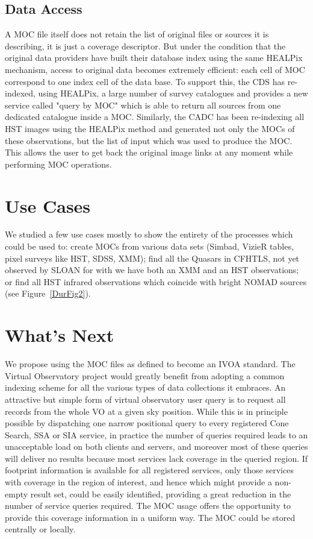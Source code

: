 \subsection{Data Access}
A MOC file itself does not retain the list of original files or sources it is describing, it is just a coverage descriptor. But under the condition that the original data providers have built their database index using the same HEALPix mechanism, access to original data becomes extremely efficient: each cell of MOC correspond to one index cell of the data base. To support this, the CDS has re-indexed, using HEALPix, a large number of survey catalogues and provides a new service called "query by MOC" which is able to return all sources from one dedicated catalogue inside a MOC. Similarly, the CADC has been re-indexing all HST images using the HEALPix method and generated not only the MOCs of these observations, but the list of input which was used to produce the MOC. This allows the user to get back the original image links at any moment while performing MOC operations.

\section{Use Cases}
We studied a few use cases mostly to show the entirety of the processes which could be used to: create MOCs from various data sets (Simbad, VizieR tables, pixel surveys like HST, SDSS, XMM); find all the Quasars in CFHTLS, not yet observed by SLOAN for with we have both an XMM and an HST observations; or find all HST infrared observations which coincide with bright NOMAD sources (see Figure~\ref{DurFig2}).


\section{What's Next}

We propose using the MOC files as defined to become an IVOA standard. The Virtual Observatory project would greatly benefit from adopting a common indexing scheme for all the various types of data collections it embraces. An attractive but simple form of virtual observatory user query is to request all records from the whole VO at a given sky position. While this is in principle possible by dispatching one narrow positional query to every registered Cone Search, SSA or SIA service, in practice the number of queries required leads to an unacceptable load on both clients and servers, and moreover most of these queries will deliver no results because most services lack coverage in the queried region. If footprint information is available for all registered services, only those services with coverage in the region of interest, and hence which might provide a non-empty result set, could be easily identified, providing a great reduction in the number of service queries required. The MOC usage offers the opportunity to provide this coverage information in a uniform way. The MOC could be stored centrally or locally.


